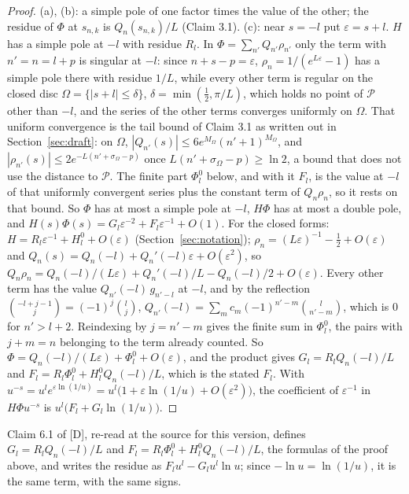 \documentclass[11pt]{article}
\begin{document}
\begin{proof}
(a), (b): a simple pole of one factor times the value of the other; the residue of $\Phi$ at $s_{n,k}$ is $Q_n(s_{n,k})/L$ (Claim 3.1). (c): near $s=-l$ put $\varepsilon=s+l$. $H$ has a simple pole at $-l$ with residue $R_l$. In $\Phi=\sum_{n'}Q_{n'}\rho_{n'}$ only the term with $n'=n=l+p$ is singular at $-l$: since $n+s-p=\varepsilon$, $\rho_n=1/(e^{L\varepsilon}-1)$ has a simple pole there with residue $1/L$, while every other term is regular on the closed disc $\Omega=\{|s+l|\le\delta\}$, $\delta=\min(\frac12,\pi/L)$, which holds no point of $\mathcal{P}$ other than $-l$, and the series of the other terms converges uniformly on $\Omega$. That uniform convergence is the tail bound of Claim 3.1 as written out in Section~\ref{sec:draft}: on $\Omega$, $|Q_{n'}(s)|\le6e^{M_\Omega}(n'+1)^{M_\Omega}$, and $|\rho_{n'}(s)|\le2e^{-L(n'+\sigma_\Omega-p)}$ once $L(n'+\sigma_\Omega-p)\ge\ln2$, a bound that does not use the distance to $\mathcal{P}$. The finite part $\Phi^0_l$ below, and with it $F_l$, is the value at $-l$ of that uniformly convergent series plus the constant term of $Q_n\rho_n$, so it rests on that bound. So $\Phi$ has at most a simple pole at $-l$, $H\Phi$ has at most a double pole, and $H(s)\Phi(s)=G_l\varepsilon^{-2}+F_l\varepsilon^{-1}+O(1)$. For the closed forms: $H=R_l\varepsilon^{-1}+H^0_l+O(\varepsilon)$ (Section~\ref{sec:notation}); $\rho_n=(L\varepsilon)^{-1}-\frac12+O(\varepsilon)$ and $Q_n(s)=Q_n(-l)+Q_n'(-l)\varepsilon+O(\varepsilon^2)$, so $Q_n\rho_n=Q_n(-l)/(L\varepsilon)+Q_n'(-l)/L-Q_n(-l)/2+O(\varepsilon)$. Every other term has the value $Q_{n'}(-l)\,g_{n'-l}$ at $-l$, and by the reflection $\binom{-l+j-1}{j}=(-1)^j\binom{l}{j}$, $Q_{n'}(-l)=\sum_mc_m(-1)^{n'-m}\binom{l}{n'-m}$, which is $0$ for $n'>l+2$. Reindexing by $j=n'-m$ gives the finite sum in $\Phi^0_l$, the pairs with $j+m=n$ belonging to the term already counted. So $\Phi=Q_n(-l)/(L\varepsilon)+\Phi^0_l+O(\varepsilon)$, and the product gives $G_l=R_lQ_n(-l)/L$ and $F_l=R_l\Phi^0_l+H^0_lQ_n(-l)/L$, which is the stated $F_l$. With $u^{-s}=u^le^{\varepsilon\ln(1/u)}=u^l\bigl(1+\varepsilon\ln(1/u)+O(\varepsilon^2)\bigr)$, the coefficient of $\varepsilon^{-1}$ in $H\Phi u^{-s}$ is $u^l\bigl(F_l+G_l\ln(1/u)\bigr)$.
\end{proof}

Claim 6.1 of [D], re-read at the source for this version, defines $G_l=R_lQ_n(-l)/L$ and $F_l=R_l\Phi^0_l+H^0_lQ_n(-l)/L$, the formulas of the proof above, and writes the residue as $F_lu^l-G_lu^l\ln u$; since $-\ln u=\ln(1/u)$, it is the same term, with the same signs.
\end{document}
